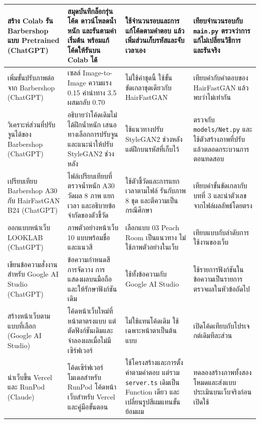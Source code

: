 {\begin{longtable}{|L{2.6cm}|L{3.6cm}|L{3.4cm}|L{3.6cm}|}
สร้าง Colab รัน Barbershop แบบ Pretrained (ChatGPT)
& สมุดบันทึกล็อกรุ่นโค้ด ดาวน์โหลดน้ำหนัก และรันตามค่าเริ่มต้น พร้อมแก้โค้ดให้รันบน Colab ได้
& ใช้จำนวนรอบและการแก้โค้ดตามคำตอบ แล้วเพิ่มส่วนเก็บรหัสและจับเวลาเอง
& เทียบจำนวนรอบกับ \texttt{main.py} ตรวจว่าการแก้ไม่เปลี่ยนวิธีการ และรันจริง \\ \hline
เพิ่มขั้นปรับภาพต่อจาก Barbershop (ChatGPT)
& เซลล์ Image-to-Image ความแรง 0.15 ค่านำทาง 3.5 ผสมกลับ 0.70
& ไม่ใช้ค่าชุดนี้ ใช้ขั้นขัดเกลาชุดเดียวกับ HairFastGAN
& เทียบค่ากับคำตอบของ HairFastGAN แล้วพบว่าไม่เท่ากัน \\ \hline
วิเคราะห์ส่วนที่ปรับจูนได้ของ Barbershop (ChatGPT)
& อธิบายว่าโค้ดเดิมไม่ได้ฝึกน้ำหนัก เสนอทางเลือกการปรับจูน และแนะนำให้ปรับ StyleGAN2 ช่วงหลัง
& ใช้แนวทางปรับ StyleGAN2 ช่วงหลัง แต่ฝึกบนรหัสที่เก็บไว้
& ตรวจกับ \texttt{models/Net.py} และใช้ตัวสร้างภาพที่ปรับแล้วตลอดกระบวนการตอนทดสอบ \\ \hline
เปรียบเทียบ Barbershop A30 กับ HairFastGAN B24 (ChatGPT)
& ไฟล์เปรียบเทียบที่ตรวจน้ำหนัก A30 วัดผล 8 ภาพ แยกเวลา และอธิบายข้อจำกัดของตัวชี้วัด
& ใช้ตัวชี้วัดและการแยกเวลาตามไฟล์ รันกับภาพ 8 ชุด และตีความเป็นกรณีศึกษา
& เทียบค่าขั้นขัดเกลากับบทที่ 3 และนำตัวเลขจากไฟล์ผลลัพธ์โดยตรง \\ \hline
ออกแบบหน้าเว็บ LOOKLAB (ChatGPT)
& ภาพตัวอย่างหน้าเว็บ 10 แบบพร้อมชื่อและแนวสี
& เลือกแบบ 03 Peach Room เป็นแนวทาง ไม่ใช้ภาพตัวอย่างในเว็บ
& เทียบแบบกับลำดับการใช้งานของเว็บ \\ \hline
เขียนข้อความสั่งงานสำหรับ Google AI Studio (ChatGPT)
& ข้อความกำหนดสี การจัดวาง การแสดงผลบนมือถือ และให้รักษาฟังก์ชันเดิม
& ใช้ทั้งข้อความกับ Google AI Studio
& ใช้รายการฟังก์ชันในข้อความเป็นรายการตรวจผลในหัวข้อถัดไป \\ \hline
สร้างหน้าเว็บตามแบบที่เลือก (Google AI Studio)
& โค้ดหน้าเว็บใหม่ที่หน้าตาตรงแบบ แต่ตัดฟังก์ชันเดิมและจำลองผลเมื่อไม่มีเซิร์ฟเวอร์
& ไม่ใช้แทนโค้ดเดิม ใช้เฉพาะหน้าตาเป็นต้นแบบ
& เปิดโค้ดเทียบกับโปรเจกต์เดิมทีละส่วน \\ \hline
นำเว็บขึ้น Vercel และ RunPod (Claude)
& โค้ดเซิร์ฟเวอร์โมเดลสำหรับ RunPod โค้ดหน้าเว็บสำหรับ Vercel และคู่มือขั้นตอน
& ใช้โครงสร้างและการตั้งค่าตามคำตอบ แต่รวม \texttt{server.ts} เดิมเป็น Function เดียว และเปลี่ยนรูปสีผมแทนขั้นย้อมผม
& ทดลองสร้างภาพทั้งสองโหมดและส่งแบบประเมินบนเว็บจริงก่อนเปิดใช้ \\ \hline
\end{longtable}
}
